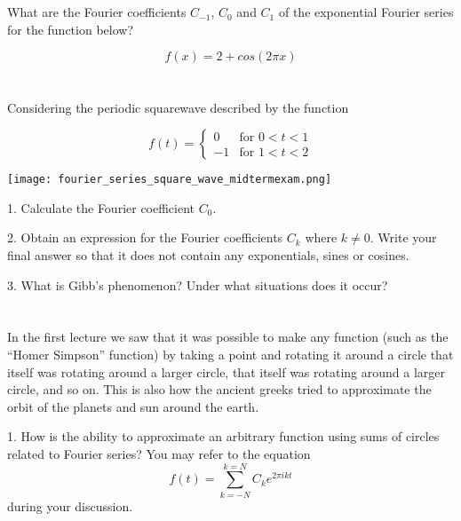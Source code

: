\section{}

What are the Fourier coefficients $C_{-1}$, $C_{0}$ and $C_{1}$ of the exponential Fourier series for the function below?

\begin{equation}
  f(x)=2+cos(2 \pi x)
\end{equation}




\section{}

Considering the periodic squarewave described by the function

\begin{equation}
    f(t)=
    \begin{cases}
        0 & \text{for } 0<t<1 \\
        -1 & \text{for } 1<t<2
    \end{cases}
\end{equation}

\begin{center}
\texttt{[image: fourier\_series\_square\_wave\_midtermexam.png]}
\end{center}

1. Calculate the Fourier coefficient $C_0$.

2. Obtain an expression for the Fourier coefficients $C_k$ where $k \ne 0$. Write your final answer so that it does not contain any exponentials, sines or cosines.

3. What is Gibb's phenomenon? Under what situations does it occur?




\section{}

In the first lecture we saw that it was possible to make any function (such as the ``Homer Simpson'' function) by taking a point and rotating it around a circle that itself was rotating around a larger circle, that itself was rotating around a larger circle, and so on. This is also how the ancient greeks tried to approximate the orbit of the planets and sun around the earth.

1. How is the ability to approximate an arbitrary function using sums of circles related to Fourier series? You may refer to the equation
\begin{equation}
    f(t) = \sum_{k=-N}^{k=N} C_k e^{2 \pi i k t}
\end{equation}
during your discussion.


